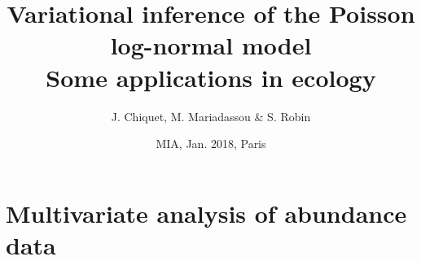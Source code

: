 \documentclass[9pt]{beamer}
\newcommand{\fignet}{/home/robin/Bureau/RECHERCHE/RESEAUX/EXPOSES/FIGURES}
\begin{document}

\title[Variational inference of the PLN model]{Variational inference of the Poisson log-normal model \\ Some applications in ecology}

\author[S. Robin]{J. Chiquet, M. Mariadassou \& S. Robin}


\date[MIA, Paris]{MIA, Jan. 2018, Paris}

\maketitle

\section{Multivariate analysis of abundance data}
\frame{\tableofcontents[currentsection]}

\end{document}
